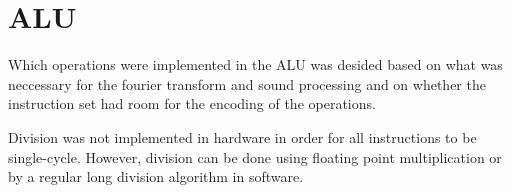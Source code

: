 \FloatBarrier
\section{ALU}\label{sec:fpga-alu}

Which operations were implemented in the ALU was desided based on what
was neccessary for the fourier transform and sound processing and on
whether the instruction set had room for the encoding of the operations.

Division was not implemented in hardware in order for all instructions to be
single-cycle. However, division can be done using floating point multiplication
or by a regular long division algorithm in software.

%
%
%
%
